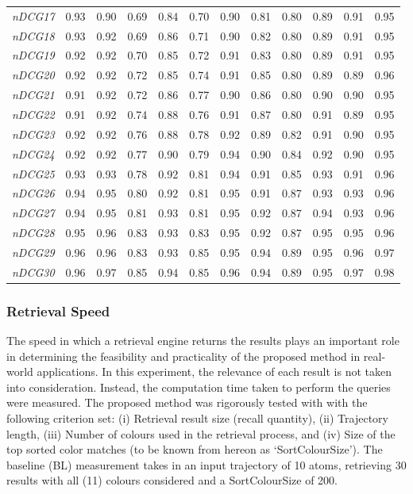\begin{table}[tb!]
{\begin{tabular}{c||c|c|c|c|c|c|c|c|c|c|c}
\textit{nDCG17} & 0.93 & 0.90 & 0.69 & 0.84 & 0.70 & 0.90 & 0.81 & 0.80 & 0.89 & 0.91 & 0.95 \\
\textit{nDCG18} & 0.93 & 0.92 & 0.69 & 0.86 & 0.71 & 0.90 & 0.82 & 0.80 & 0.89 & 0.91 & 0.95 \\
\textit{nDCG19} & 0.92 & 0.92 & 0.70 & 0.85 & 0.72 & 0.91 & 0.83 & 0.80 & 0.89 & 0.91 & 0.95 \\
\textit{nDCG20} & 0.92 & 0.92 & 0.72 & 0.85 & 0.74 & 0.91 & 0.85 & 0.80 & 0.89 & 0.89 & 0.96 \\
\textit{nDCG21} & 0.91 & 0.92 & 0.72 & 0.86 & 0.77 & 0.90 & 0.86 & 0.80 & 0.90 & 0.90 & 0.95 \\
\textit{nDCG22} & 0.91 & 0.92 & 0.74 & 0.88 & 0.76 & 0.91 & 0.87 & 0.80 & 0.91 & 0.89 & 0.95 \\
\textit{nDCG23} & 0.92 & 0.92 & 0.76 & 0.88 & 0.78 & 0.92 & 0.89 & 0.82 & 0.91 & 0.90 & 0.95 \\
\textit{nDCG24} & 0.92 & 0.92 & 0.77 & 0.90 & 0.79 & 0.94 & 0.90 & 0.84 & 0.92 & 0.90 & 0.95 \\
\textit{nDCG25} & 0.93 & 0.93 & 0.78 & 0.92 & 0.81 & 0.94 & 0.91 & 0.85 & 0.93 & 0.91 & 0.96 \\
\textit{nDCG26} & 0.94 & 0.95 & 0.80 & 0.92 & 0.81 & 0.95 & 0.91 & 0.87 & 0.93 & 0.93 & 0.96 \\
\textit{nDCG27} & 0.94 & 0.95 & 0.81 & 0.93 & 0.81 & 0.95 & 0.92 & 0.87 & 0.94 & 0.93 & 0.96 \\
\textit{nDCG28} & 0.95 & 0.96 & 0.83 & 0.93 & 0.83 & 0.95 & 0.92 & 0.87 & 0.95 & 0.95 & 0.96 \\
\textit{nDCG29} & 0.96 & 0.96 & 0.83 & 0.93 & 0.85 & 0.95 & 0.94 & 0.89 & 0.95 & 0.96 & 0.97 \\
\textit{nDCG30} & 0.96 & 0.97 & 0.85 & 0.94 & 0.85 & 0.96 & 0.94 & 0.89 & 0.95 & 0.97 & 0.98 \\
\end{tabular}}
\end{table}

\subsubsection{Retrieval Speed}

The speed in which a retrieval engine returns the results plays an important role in determining the feasibility and practicality of the proposed method in real-world applications. In this experiment, the relevance of each result is not taken into consideration. Instead, the computation time taken to perform the queries were measured. The proposed method was rigorously tested with with the following criterion set: (i) Retrieval result size (recall quantity), (ii) Trajectory length, (iii) Number of colours used in the retrieval process, and (iv) Size of the top sorted color matches (to be known from hereon as `SortColourSize'). The baseline (BL) measurement takes in an input trajectory of 10 atoms, retrieving 30 results with all (11) colours considered and a SortColourSize of 200.

